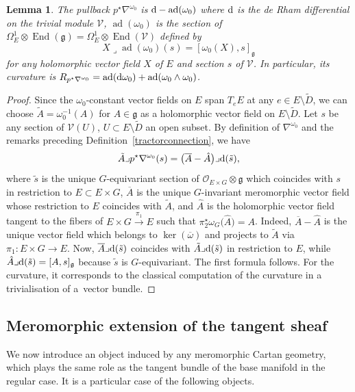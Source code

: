\documentclass[10pt,a4paper]{amsart}
\numberwithin{equation}{section}
\newtheorem{Lemma}[Theorem]{Lemma}
\begin{document}
\begin{Lemma}\label{curvaturetractor} The pullback $p^\star \nabla^{\omega_0}$ is ${\rm d} - \operatorname{ad}(\omega_0)$ where ${\rm d}$ is the de Rham differential on the trivial module $\mathcal{V}$, $\operatorname{ad}(\omega_0)$ is the section of $\Omega^1_E \otimes \operatorname{End}(\mathfrak{g}) = \Omega^1_E \otimes \operatorname{End}(\mathcal{V})$ defined by
\[X\lrcorner \operatorname{ad}(\omega_0)(s)= [\omega_0(X),s]_\mathfrak{g}\] for any holomorphic vector field $X$ of $E$ and section $s$ of $\mathcal{V}$. In particular, its curvature is $R_{p^\star \nabla^{\omega_0}} = \operatorname{ad}({\rm d}\omega_0) + \operatorname{ad}(\omega_0\wedge \omega_0)$. \end{Lemma}
\begin{proof}Since the $\omega_0$-constant vector fields on $E$ span $T_eE$ at any $e\in E\setminus \tilde{D}$, we can choose $\tilde{A}=\omega_0^{-1}(A)$ for $A\in \mathfrak{g}$ as a holomorphic vector field on $E\setminus \tilde{D}$. Let $s$ be any section of $\mathcal{V}(U)$, $U\subset E\setminus \tilde{D}$ an open subset. By definition of $\nabla^{\omega_0}$ and the remarks preceding Definition~\ref{tractorconnection}, we have
\[\tilde{A}\lrcorner p^\star \nabla^{\omega_0}(s) =\big(\overline{A}-\hat{A}\big)\lrcorner {\rm d}(\tilde{s}),\]
where $\tilde{s}$ is the unique $G$-equivariant section of $\mathcal{O}_{E\times G}\otimes \mathfrak{g}$ which coincides with $s$ in restriction to $E\subset E\times G$, $\overline{A}$ is the unique $G$-invariant meromorphic vector field whose restriction to $E$ coincides with $\tilde{A}$, and $\hat{A}$ is the holomorphic vector field tangent to the fibers of $E\times G \overset{\pi_1}{\longrightarrow} E$ such that $\pi_2^\star \omega_G\big(\hat{A}\big)=A$. Indeed, $\overline{A}-\hat{A}$ is the unique vector field which belongs to $\ker(\overline{\omega})$ and projects to $\tilde{A}$ via $\pi_1\colon E\times G\longrightarrow E$. Now, $\overline{A} \lrcorner {\rm d}(\tilde{s})$ coincides with $\tilde{A}\lrcorner {\rm d}(\tilde{s})$ in restriction to $E$, while $\hat{A}\lrcorner {\rm d}(\tilde{s}) = [A,s]_\mathfrak{g}$ because $\tilde{s}$ is $G$-equivariant. The first formula follows. For the curvature, it corresponds to the classical computation of the curvature in a trivialisation of a~vector bundle.
\end{proof}

\subsection{Meromorphic extension of the tangent sheaf}
We now introduce an object induced by any meromorphic Cartan geometry, which plays the same role as the tangent bundle of the base manifold in the regular case. It is a particular case of the following objects.
\end{document}
